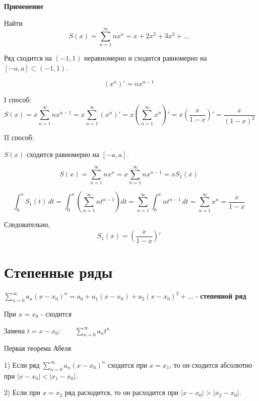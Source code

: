 \documentclass[12pt,a4paper]{article}
\begin{document}
\begin{example}

    \textbf{Применение}

    Найти
    \[
        S(x)=\sum_{n=1}^{\infty}nx^n=x+2x^2+3x^3+\ldots
    \]

    Ряд сходится на $(-1,1)$ неравномерно и сходится равномерно на $[-a,a]\subset(-1,1)$.

    \[
        (x^n)'=nx^{n-1}
    \]

    I способ:
    \[
        S(x)
        =
        x\sum_{n=1}^{\infty}nx^{n-1}
        =
        x\sum_{n=1}^{\infty}(x^n)'
        =
        x\left(\sum_{n=1}^{\infty}x^n\right)'
        =
        x\left(\frac{x}{1-x}\right)'
        =
        \frac{x}{(1-x)^2}
    \]

    II способ:

    $S(x)$ сходится равномерно на $[-a,a]$.

    \[
        S(x)
        =
        \sum_{n=1}^{\infty}nx^n
        =
        x\sum_{n=1}^{\infty}nx^{n-1}
        =
        xS_1(x)
    \]

    \[
        \int_0^x S_1(t)\,dt
        =
        \int_0^x\left(\sum_{n=1}^{\infty}nt^{n-1}\right)dt
        =
        \sum_{n=1}^{\infty}\int_0^x nt^{n-1}\,dt
        =
        \sum_{n=1}^{\infty}x^n
        =
        \frac{x}{1-x}
    \]

    Следовательно,
    \[
        S_1(x)
        =
        \left(\frac{x}{1-x}\right)'
    \]

\end{example}

\newpage

\section{Степенные ряды}

\begin{definition}
    $\sum_{n=0}^\infty a_n(x-x_0)^n = a_0 + a_1(x-x_0) + a_2(x-x_0)^2 + ...$ - \textbf{степенной ряд}

    При $x = x_0$ - сходится

    Замена $t = x - x_0: \qquad \sum_{n=0}^\infty a_nt^n$
\end{definition}

\begin{theorem}{Первая теорема Абеля}

    1) Если ряд $\sum_{n=0}^{\infty}a_n(x-x_0)^n$ сходится при $x=x_1$, то он сходится абсолютно при $|x-x_0|<|x_1-x_0|$.

    2)  Если при $x=x_2$ ряд расходится, то он расходится при $|x-x_0|>|x_2-x_0|$.

\end{theorem}
\end{document}

